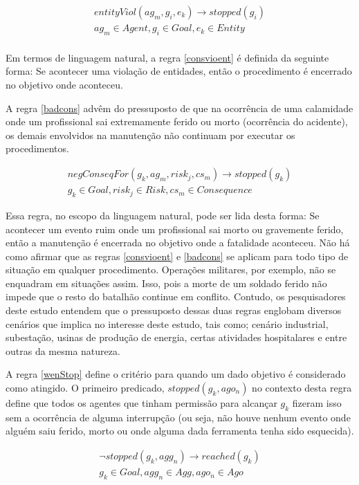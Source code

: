 \begin{eqnarray}\label{consvioent}
	entityViol(ag_m,g_i,e_k) \to stopped(g_i) \nonumber \\  
    ag_m \in Agent, g_i \in Goal, e_k \in Entity \\ \nonumber
\end{eqnarray}

Em termos de linguagem natural, a regra \ref{consvioent} é definida da seguinte forma: Se acontecer uma violação de entidades, então o procedimento é encerrado no objetivo onde aconteceu. 

A regra \ref{badcons} advêm do pressuposto de que na ocorrência de uma calamidade onde um profissional sai extremamente ferido ou morto (ocorrência do acidente), os demais envolvidos na manutenção não continuam por executar os procedimentos. 
 
 \begin{eqnarray}\label{badcons}
	negConseqFor(g_k,ag_m,risk_j,cs_m) \to stopped(g_k) \nonumber \\ 
    g_k \in Goal, risk_j \in Risk, cs_m \in Consequence
\end{eqnarray}

Essa regra, no escopo da linguagem natural, pode ser lida desta forma: Se acontecer um evento ruim onde um profissional sai morto ou gravemente ferido, então a manutenção é encerrada no objetivo onde a fatalidade aconteceu. Não há como afirmar que as regras  \ref{consvioent} e \ref{badcons} se aplicam para todo tipo de situação em qualquer procedimento. Operações militares, por exemplo, não se enquadram em situações assim. Isso, pois a morte de um soldado ferido não impede que o resto do batalhão continue em conflito. Contudo, os pesquisadores deste estudo entendem que o pressuposto dessas duas regras englobam diversos cenários que implica no interesse deste estudo, tais como; cenário industrial, subestação, usinas de produção de energia, certas atividades hospitalares e entre outras da mesma natureza.  

A regra \ref{wenStop} define o critério para quando um dado objetivo é considerado como atingido. O primeiro predicado, $stopped(g_k,ago_n)$ no contexto desta regra define que todos os agentes que tinham permissão para alcançar $g_k$ fizeram isso sem a ocorrência de alguma interrupção (ou seja, não houve nenhum evento onde alguém saiu ferido, morto ou onde alguma dada ferramenta tenha sido esquecida).  

\begin{eqnarray}\label{wenStop}
	\neg stopped(g_k,agg_n) \to reached(g_k) \nonumber \\ 
    g_k \in Goal, agg_n \in Agg, ago_n \in Ago 
\end{eqnarray}

